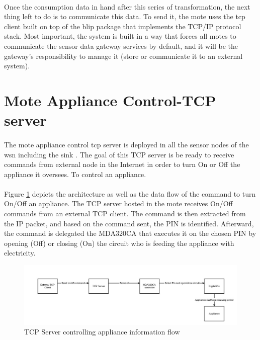 \documentclass[oneside,12pt,a4paper,final]{book}
\begin{document}
\paragraph{}
Once the consumption data in hand after this series of transformation, the next thing left to do is to communicate this data. To send it, the mote uses the \gls{tcp} client built on top of the \gls{blip} package that implements the TCP/IP protocol stack. Most important, the system is built in a way that forces all motes to communicate the sensor data gateway services by default, and it will be the gateway's responsibility to manage it (store or communicate it to an external system).

\section{ Mote Appliance Control-TCP server}
\paragraph{}
The mote appliance control \gls{tcp} server is deployed in all the sensor nodes of the \gls{wsn} including the sink . The goal of this TCP server is be ready to receive commands from external node in the Internet in order to turn On or Off the appliance it oversees. To control an appliance.
\paragraph{}
Figure \ref{fig:appliance_control} depicts the architecture as well as the data flow of the command to turn On/Off an appliance. The TCP server hosted in the mote receives On/Off commands from an external TCP client. The command is then extracted from the IP packet, and based on the command sent, the PIN is identified. Afterward, the command is delegated the MDA320CA that executes it on the chosen PIN by opening (Off) or closing (On) the circuit who is feeding the appliance with electricity.

\begin{figure}[htbp]
\centering
\includegraphics[scale=0.35]{img/appliance_control.jpg}
\caption{TCP Server controlling appliance information flow}
\label{fig:appliance_control}
\end{figure}
\end{document}

